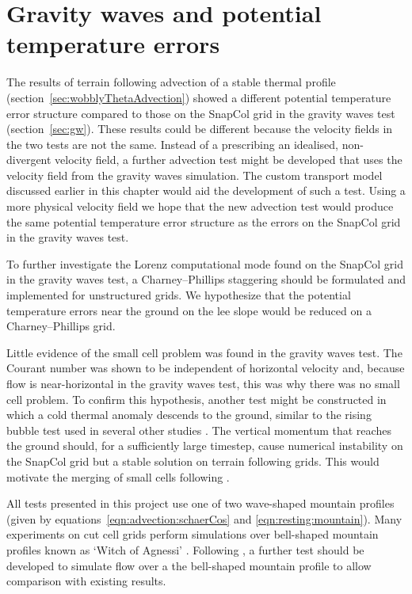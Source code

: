 \section{Gravity waves and potential temperature errors}
\label{sec:further-work:gw}

The results of terrain following advection of a stable thermal profile (section~\ref{sec:wobblyThetaAdvection}) showed a different potential temperature error structure compared to those on the SnapCol grid in the gravity waves test (section~\ref{sec:gw}).  These results could be different because the velocity fields in the two tests are not the same.  Instead of a prescribing an idealised, non-divergent velocity field, a further advection test might be developed that uses the velocity field from the gravity waves simulation.  The custom transport model discussed earlier in this chapter would aid the development of such a test.  Using a more physical velocity field we hope that the new advection test would produce the same potential temperature error structure as the errors on the SnapCol grid in the gravity waves test.

To further investigate the Lorenz computational mode found on the SnapCol grid in the gravity waves test, a Charney--Phillips staggering should be formulated and implemented for unstructured grids.  We hypothesize that the potential temperature errors near the ground on the lee slope would be reduced on a Charney--Phillips grid.

Little evidence of the small cell problem was found in the gravity waves test.  The Courant number was shown to be independent of horizontal velocity and, because flow is near-horizontal in the gravity waves test, this was why there was no small cell problem.  To confirm this hypothesis, another test might be constructed in which a cold thermal anomaly descends to the ground, similar to the rising bubble test used in several other studies \parencites{bonaventura2000}{jebens2011}{good2013}.  The vertical momentum that reaches the ground should, for a sufficiently large timestep, cause numerical instability on the SnapCol grid but a stable solution on terrain following grids.  This would motivate the merging of small cells following \textcite{yamazaki-satomura2010}.

All tests presented in this project use one of two wave-shaped mountain profiles (given by equations~\ref{eqn:advection:schaerCos} and \ref{eqn:resting:mountain}).  Many experiments on cut cell grids perform simulations over bell-shaped mountain profiles known as `Witch of Agnessi' \parencites{steppeler2002}{rosatti2005}{klein2009}{jebens2011}.  Following \textcite{gallus-klemp2000}, a further test should be developed to simulate flow over a the bell-shaped mountain profile to allow comparison with existing results.

